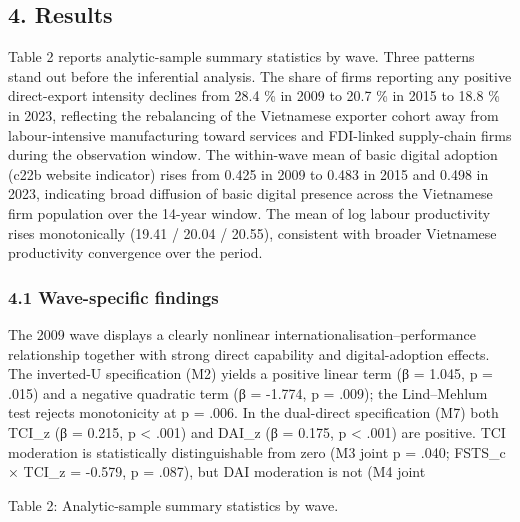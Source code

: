 \documentclass[12pt,a4paper]{article}
\begin{document}
\hypertarget{4-results}{%
\subsection{4. Results}\label{4-results}}

Table 2 reports analytic-sample summary statistics by wave. Three
patterns stand out before the inferential analysis. The share of firms
reporting any positive direct-export intensity declines from 28.4 \% in
2009 to 20.7 \% in 2015 to 18.8 \% in 2023, reflecting the rebalancing
of the Vietnamese exporter cohort away from labour-intensive
manufacturing toward services and FDI-linked supply-chain firms during
the observation window. The within-wave mean of basic digital adoption
(c22b website indicator) rises from 0.425 in 2009 to 0.483 in 2015 and
0.498 in 2023, indicating broad diffusion of basic digital presence
across the Vietnamese firm population over the 14-year window. The mean
of log labour productivity rises monotonically (19.41 / 20.04 / 20.55),
consistent with broader Vietnamese productivity convergence over the
period.

\hypertarget{41-wave-specific-findings}{%
\subsubsection{4.1 Wave-specific
findings}\label{41-wave-specific-findings}}

The 2009 wave displays a clearly nonlinear
internationalisation--performance relationship together with strong
direct capability and digital-adoption effects. The inverted-U
specification (M2) yields a positive linear term (β = 1.045, p = .015)
and a negative quadratic term (β = -1.774, p = .009); the Lind--Mehlum
test rejects monotonicity at p = .006. In the dual-direct specification
(M7) both TCI\_z (β = 0.215, p \textless{} .001) and DAI\_z (β = 0.175,
p \textless{} .001) are positive. TCI moderation is statistically
distinguishable from zero (M3 joint p = .040; FSTS\_c × TCI\_z = -0.579,
p = .087), but DAI moderation is not (M4 joint

Table 2: Analytic-sample summary statistics by wave.
\end{document}
